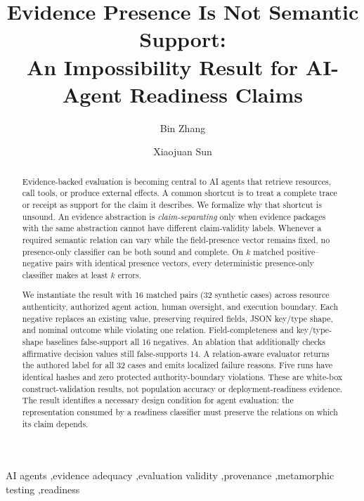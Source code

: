 \documentclass[preprint,12pt]{elsarticle}
\begin{document}
\begin{frontmatter}

\title{Evidence Presence Is Not Semantic Support:\\
An Impossibility Result for AI-Agent Readiness Claims}

\author[aff1]{Bin Zhang}
\author[aff2]{Xiaojuan Sun}
\address[aff1]{Shanxi Youqibing E-Commerce Co., Ltd., Yuncheng, Shanxi, China}
\address[aff2]{Department of Physical Education, Yuncheng University, Yuncheng, Shanxi 044000, China}

\begin{abstract}
Evidence-backed evaluation is becoming central to AI agents that retrieve resources, call tools, or produce external effects. A common shortcut is to treat a complete trace or receipt as support for the claim it describes. We formalize why that shortcut is unsound. An evidence abstraction is \emph{claim-separating} only when evidence packages with the same abstraction cannot have different claim-validity labels. Whenever a required semantic relation can vary while the field-presence vector remains fixed, no presence-only classifier can be both sound and complete. On $k$ matched positive--negative pairs with identical presence vectors, every deterministic presence-only classifier makes at least $k$ errors.

We instantiate the result with 16 matched pairs (32 synthetic cases) across resource authenticity, authorized agent action, human oversight, and execution boundary. Each negative replaces an existing value, preserving required fields, JSON key/type shape, and nominal outcome while violating one relation. Field-completeness and key/type-shape baselines false-support all 16 negatives. An ablation that additionally checks affirmative decision values still false-supports 14. A relation-aware evaluator returns the authored label for all 32 cases and emits localized failure reasons. Five runs have identical hashes and zero protected authority-boundary violations. These are white-box construct-validation results, not population accuracy or deployment-readiness evidence. The result identifies a necessary design condition for agent evaluation: the representation consumed by a readiness classifier must preserve the relations on which its claim depends.
\end{abstract}

\begin{keyword}
AI agents \sep evidence adequacy \sep evaluation validity \sep provenance \sep metamorphic testing \sep readiness
\end{keyword}

\end{frontmatter}
\end{document}
